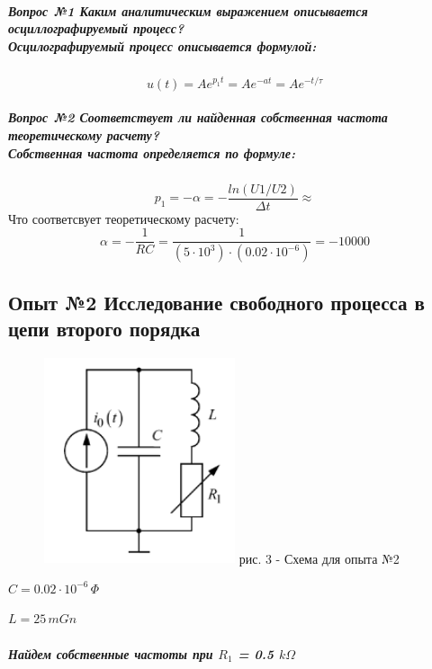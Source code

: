 \documentclass[a4paper,12pt]{report}
\begin{document}
\begin{flushleft}
  \subparagraph*{Вопрос №1 Каким аналитическим выражением описывается осциллографируемый процесс?\\ Осцилографируемый процесс описывается формулой:}
  \[ u(t) = Ae^{p_1t} = Ae^{-at} = Ae^{-t/\tau} \]
  \subparagraph*{Вопрос №2 Соответствует ли найденная собственная частота
  теоретическому расчету?\\ Собственная частота определяется по формуле:}
  \[ p_1 = - \alpha = -\frac{ln(U1/U2)}{\Delta t} \approx \]
  Что соответсвует теоретическому расчету:
  \[ \alpha = - \frac{1}{RC} = \frac{1}{(5\cdot 10^{3})\cdot (0.02\cdot 10^{-6})} = -10000 \]

    \newpage

	\item\subsection*{Опыт №2  Исследование свободного процесса в цепи второго порядка}
	\item
  \begin{figure}[h!]
    \includegraphics[width=0.5\textwidth]{image2.png}
    \label{ris:image3}
    рис. 3 - Схема для опыта №2 
\end{figure}
\par $C = 0.02 \cdot 10^{-6} \, \Phi$
\par $L = 25 \, mGn$
\newpage
  
\subparagraph*{Найдем собственные частоты при $R_1$ = 0.5 $k\Omega$}


\end{flushleft}
\end{document}
